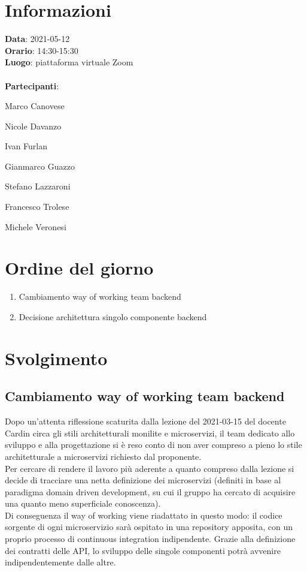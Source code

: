 \section{Informazioni}
\textbf{Data}: 2021-05-12 \\
\textbf{Orario}: 14:30-15:30 \\
\textbf{Luogo}: piattaforma virtuale Zoom \\\\
\textbf{Partecipanti}:\begin{list}{*}{\setlength{\itemsep}{0cm}}
	\item Marco Canovese
	\item Nicole Davanzo
	\item Ivan Furlan
	\item Gianmarco Guazzo
	\item Stefano Lazzaroni
	\item Francesco Trolese
	\item Michele Veronesi
\end{list}

\section{Ordine del giorno}
\begin{enumerate}
	\item Cambiamento way of working team backend
	\item Decisione architettura singolo componente backend
\end{enumerate}

\section{Svolgimento}
\subsection{Cambiamento way of working team backend}
Dopo un'attenta riflessione scaturita dalla lezione del 2021-03-15 del docente Cardin circa gli stili architetturali monilite e microservizi,
il team dedicato allo sviluppo e alla progettazione si è reso conto di non aver compreso a pieno lo stile architetturale a microservizi richiesto dal proponente.\\
Per cercare di rendere il lavoro più aderente a quanto compreso dalla lezione si decide di tracciare una netta definizione dei microservizi (definiti in base al paradigma
domain driven development, su cui il gruppo ha cercato di acquisire una quanto meno superficiale conoscenza).\\
Di conseguenza il way of working viene riadattato in questo modo: il codice sorgente di ogni microservizio sarà ospitato in una repository apposita, con un proprio processo di
continuous integration indipendente. Grazie alla definizione dei contratti delle API, lo sviluppo delle singole componenti potrà avvenire indipendentemente dalle altre.

